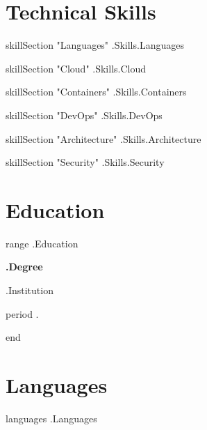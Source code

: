 \documentclass[11pt,a4paper]{article}
\begin{document}
\section*{Technical Skills}

{{ skillSection "Languages" .Skills.Languages }}

{{ skillSection "Cloud" .Skills.Cloud }}

{{ skillSection "Containers" .Skills.Containers }}

{{ skillSection "DevOps" .Skills.DevOps }}

{{ skillSection "Architecture" .Skills.Architecture }}

{{ skillSection "Security" .Skills.Security }}


\section*{Education}

{{ range .Education }}

\textbf{ {{ .Degree }} }

{{ .Institution }}

{{ period . }}

\vspace{0.5em}

{{ end }}


\section*{Languages}

{{ languages .Languages }}
\end{document}
